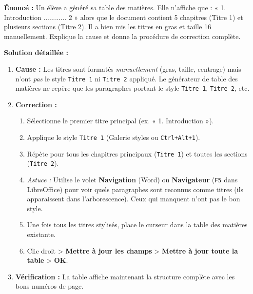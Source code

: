 \documentclass[11pt]{article}
\newcounter{popsec}
\newcounter{popsub}
\newcommand{\courssub}[1]{%
  \stepcounter{popsub}%
  \par\vspace{9pt}\noindent{\popxbold\fontsize{11.5}{13}\selectfont\color{popink}{\color{poporange}\thepopsec.\thepopsub}\hspace{6pt}#1}\par\nopagebreak\vspace{4pt}
}
\begin{document}
\begin{exoresolu}
\textbf{Énoncé :} Un élève a généré sa table des matières. Elle n'affiche que : « 1. Introduction ............ 2 » alors que le document contient 5 chapitres (Titre 1) et plusieurs sections (Titre 2). Il a bien mis les titres en gras et taille 16 manuellement. Explique la cause et donne la procédure de correction complète.

\textbf{Solution détaillée :}
\begin{enumerate}
    \item \textbf{Cause :} Les titres sont formatés \emph{manuellement} (gras, taille, centrage) mais n'ont \emph{pas} le style \texttt{Titre 1} ni \texttt{Titre 2} appliqué. Le générateur de table des matières ne repère que les paragraphes portant le style \texttt{Titre 1}, \texttt{Titre 2}, etc.
    \item \textbf{Correction :}
    \begin{enumerate}
        \item Sélectionne le premier titre principal (ex. « 1. Introduction »).
        \item Applique le style \texttt{Titre 1} (Galerie styles ou \texttt{Ctrl+Alt+1}).
        \item Répète pour tous les chapitres principaux (\texttt{Titre 1}) et toutes les sections (\texttt{Titre 2}).
        \item \textit{Astuce :} Utilise le volet \textbf{Navigation} (Word) ou \textbf{Navigateur} (\texttt{F5} dans LibreOffice) pour voir quels paragraphes sont reconnus comme titres (ils apparaissent dans l'arborescence). Ceux qui manquent n'ont pas le bon style.
        \item Une fois tous les titres stylisés, place le curseur dans la table des matières existante.
        \item Clic droit > \textbf{Mettre à jour les champs} > \textbf{Mettre à jour toute la table} > \textbf{OK}.
    \end{enumerate}
    \item \textbf{Vérification :} La table affiche maintenant la structure complète avec les bons numéros de page.
\end{enumerate}
\end{exoresolu}

\courssub{Synthèse de la section}
\end{document}
